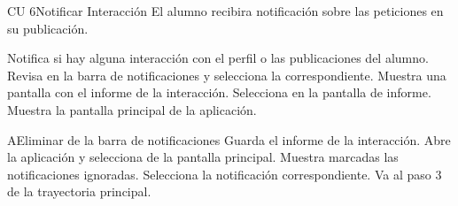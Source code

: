\begin{UseCase} {CU 6}{Notificar Interacción}{
	El alumno recibira notificación sobre las peticiones en su publicación.
}




\end{UseCase}


\begin{UCtrayectoria}
	\UCpaso [\UCsist]Notifica si hay alguna interacción con el perfil o las publicaciones del alumno.
	\UCpaso [\UCactor]Revisa en la barra de notificaciones y selecciona la correspondiente.
	\UCpaso [\UCsist]Muestra una pantalla con el informe de la interacción.
	\UCpaso [\UCactor]	Selecciona  en la pantalla de informe. 
	\UCpaso [\UCsist]Muestra la pantalla principal de la aplicación.
\end{UCtrayectoria}



\begin{UCtrayectoriaA}{A}{Eliminar de la barra de notificaciones}
	\UCpaso [\UCsist]Guarda el informe de la interacción.
	\UCpaso [\UCactor]	Abre la aplicación y selecciona  de la pantalla principal.
	\UCpaso [\UCsist]Muestra marcadas las notificaciones ignoradas.
	\UCpaso [\UCactor]	Selecciona la notificación correspondiente.
	\UCpaso Va al paso 3 de la trayectoria principal.
\end{UCtrayectoriaA}
